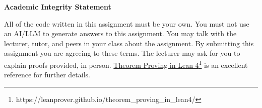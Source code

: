 \documentclass[12pt,letterpaper, onecolumn]{exam}
\begin{document}
\vspace{2mm}
\textbf{Academic Integrity Statement}

All of the code written in this assignment must be your own. You must not use an AI/LLM to generate answers to this assignment. You may talk with the lecturer, tutor, and peers in your class about the assignment. By submitting this assignment you are agreeing to these terms. The lecturer may ask for you to explain proofs provided, in person. \href{https://leanprover.github.io/theorem_proving_in_lean4/}{Theorem Proving in Lean 4}\footnote{https://leanprover.github.io/theorem\_proving\_in\_lean4/} is an excellent reference for further details.
\end{document}
